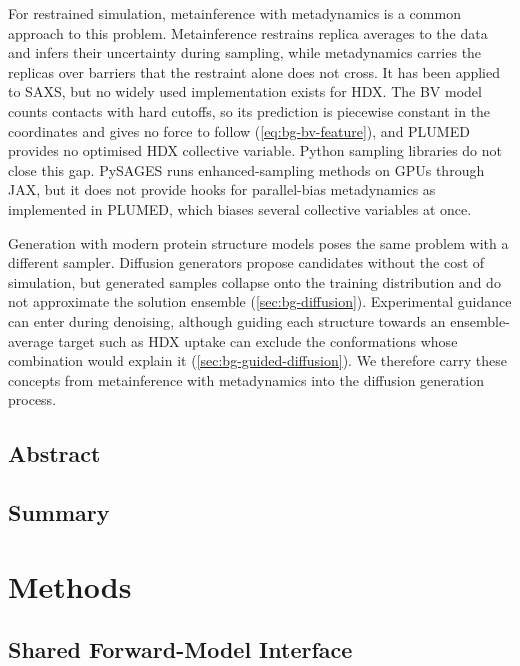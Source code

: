 For restrained simulation, metainference with metadynamics is a common approach to this problem. Metainference restrains replica averages to the data and infers their uncertainty during sampling, while metadynamics carries the replicas over barriers that the restraint alone does not cross.\supercite{bonomiMetadynamicMetainferenceEnhanced2016} It has been applied to SAXS,\supercite{ahmedRefinementASynucleinEnsembles2021} but no widely used implementation exists for HDX. The BV model counts contacts with hard cutoffs, so its prediction is piecewise constant in the coordinates and gives no force to follow (\cref{eq:bg-bv-feature}), and PLUMED provides no optimised HDX collective variable. Python sampling libraries do not close this gap. PySAGES runs enhanced-sampling methods on GPUs through JAX,\supercite{zubietaricoPySAGESFlexibleAdvanced2024} but it does not provide hooks for parallel-bias metadynamics as implemented in PLUMED,\supercite{pfaendtnerEfficientSamplingHighDimensional2015} which biases several collective variables at once.

Generation with modern protein structure models poses the same problem with a different sampler. Diffusion generators propose candidates without the cost of simulation, but generated samples collapse onto the training distribution and do not approximate the solution ensemble (\cref{sec:bg-diffusion}). Experimental guidance can enter during denoising, although guiding each structure towards an ensemble-average target such as HDX uptake can exclude the conformations whose combination would explain it (\cref{sec:bg-guided-diffusion}). We therefore carry these concepts from metainference with metadynamics into the diffusion generation process. 




\subsection{Abstract}
\label{sec:biofeat-abstract}

\subsection{Summary}
\label{sec:biofeat-summary}


\section{Methods}
\label{sec:biofeat-methods}

\subsection{Shared Forward-Model Interface}
\label{sec:biofeat-interface}

